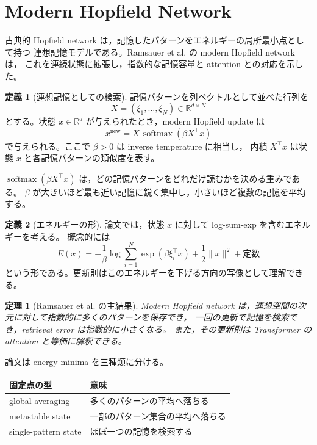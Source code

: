 \documentclass[a4paper,11pt]{ltjsarticle}
\theoremstyle{definition}
\newtheorem{definition}{定義}[section]
\theoremstyle{plain}
\newtheorem{theorem}{定理}[section]
\theoremstyle{remark}
\newcommand{\softmax}{\operatorname{softmax}}
\begin{document}
\section{Modern Hopfield Network}

古典的 Hopfield network は，記憶したパターンをエネルギーの局所最小点として持つ
連想記憶モデルである。Ramsauer et al. の modern Hopfield network は，
これを連続状態に拡張し，指数的な記憶容量と attention との対応を示した。

\begin{definition}[連想記憶としての検索]
記憶パターンを列ベクトルとして並べた行列を
\[
  X=(\xi_1,\ldots,\xi_N)\in\mathbb{R}^{d\times N}
\]
とする。状態 \(x\in\mathbb{R}^d\) が与えられたとき，modern Hopfield update は
\[
  x^{\mathrm{new}}
  =
  X\,\softmax(\beta X^\top x)
\]
で与えられる。ここで \(\beta>0\) は inverse temperature に相当し，
内積 \(X^\top x\) は状態 \(x\) と各記憶パターンの類似度を表す。
\end{definition}

\(\softmax(\beta X^\top x)\) は，どの記憶パターンをどれだけ読むかを決める重みである。
\(\beta\) が大きいほど最も近い記憶に鋭く集中し，小さいほど複数の記憶を平均する。

\begin{definition}[エネルギーの形]
論文では，状態 \(x\) に対して log-sum-exp を含むエネルギーを考える。
概念的には
\[
  E(x)
  =
  -\frac{1}{\beta}\log\sum_{i=1}^{N}
  \exp(\beta \xi_i^\top x)
  +\frac{1}{2}\|x\|^2
  +\text{定数}
\]
という形である。更新則はこのエネルギーを下げる方向の写像として理解できる。
\end{definition}

\begin{theorem}[Ramsauer et al. の主結果]
Modern Hopfield network は，連想空間の次元に対して指数的に多くのパターンを保存でき，
一回の更新で記憶を検索でき，retrieval error は指数的に小さくなる。
また，その更新則は Transformer の attention と等価に解釈できる。
\end{theorem}

論文は energy minima を三種類に分ける。

\begin{center}
\begin{tabular}{ll}
\toprule
固定点の型 & 意味 \\
\midrule
global averaging & 多くのパターンの平均へ落ちる \\
metastable state & 一部のパターン集合の平均へ落ちる \\
single-pattern state & ほぼ一つの記憶を検索する \\
\bottomrule
\end{tabular}
\end{center}
\end{document}
